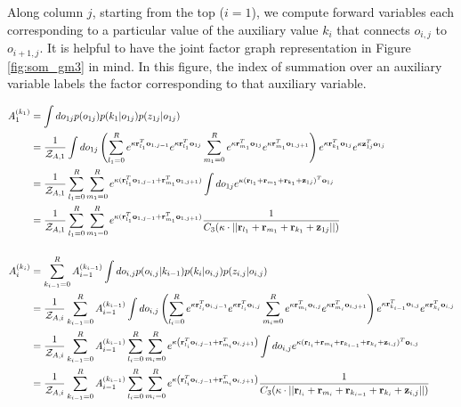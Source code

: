 \documentclass[11pt]{article}
\newcommand{\mc}{\mathcal}
\begin{document}
Along column $j$, starting from the top ($i=1$), we compute forward variables each corresponding to a particular value of the auxiliary value $k_i$ that connects $o_{i,j}$ to $o_{i+1,j}$. It is helpful to have the joint factor graph representation in Figure \ref{fig:som_gm3} in mind. In this figure, the index of summation over an auxiliary variable labels the factor corresponding to that auxiliary variable.

\begin{align}
A_1^{(k_1)} &= \int do_{1j} p(o_{1j}) p(k_1|o_{1j}) p(z_{1j}|o_{1j}) \notag \\
&= \frac{1}{\mc{Z}_{A,1}} \int do_{1j} \left( \sum_{l_1=0}^R e^{\kappa \mathbf{r}_{l_1}^T \mathbf{o}_{1,j-1}}e^{\kappa \mathbf{r}_{l_1}^T \mathbf{o}_{1j}} \sum_{m_1=0}^R e^{\kappa \mathbf{r}_{m_1}^T \mathbf{o}_{1j}} e^{\kappa \mathbf{r}_{m_1}^T \mathbf{o}_{1,j+1}} \right) e^{\kappa \mathbf{r}_{k_1}^T \mathbf{o}_{1j}} e^{\kappa \mathbf{z}_{1j}^T\mathbf{o}_{1j}} \notag \\
&= \frac{1}{\mc{Z}_{A,1}}  \sum_{l_1=0}^R \sum_{m_1=0}^R e^{\kappa (\mathbf{r}_{l_1}^T\mathbf{o}_{1,j-1}+\mathbf{r}_{m_1}^T\mathbf{o}_{1,j+1})} \int do_{1j} e^{\kappa(\mathbf{r}_{l_1}+\mathbf{r}_{m_1}+\mathbf{r}_{k_1}+\mathbf{z}_{1j})^T\mathbf{o}_{1j}} \notag \\
&= \frac{1}{\mc{Z}_{A,1}}  \sum_{l_1=0}^R \sum_{m_1=0}^R e^{\kappa (\mathbf{r}_{l_1}^T\mathbf{o}_{1,j-1}+\mathbf{r}_{m_1}^T\mathbf{o}_{1,j+1})} \frac{1}{C_3(\kappa\cdot ||\mathbf{r}_{l_1}+\mathbf{r}_{m_1}+\mathbf{r}_{k_1}+\mathbf{z}_{1j}||)} \\[5mm]
A_i^{(k_i)} &= \sum_{k_{i-1}=0}^R A_{i-1}^{(k_{i-1})} \int do_{i,j} p(o_{i,j}|k_{i-1})p(k_i|o_{i,j})p(z_{i,j}|o_{i,j}) \notag \\
&= \frac{1}{\mc{Z}_{A,i}}  \sum_{k_{i-1}=0}^R A_{i-1}^{(k_{i-1})} \int do_{i,j} \left( \sum_{l_i=0}^R e^{\kappa\mathbf{r}_{l_i}^T\mathbf{o}_{i,j-1}} e^{\kappa\mathbf{r}_{l_i}^T\mathbf{o}_{i,j}} \sum_{m_i=0}^R e^{\kappa\mathbf{r}_{m_i}^T\mathbf{o}_{i,j}} e^{\kappa\mathbf{r}_{m_i}^T\mathbf{o}_{i,j+1}}\right) e^{\kappa \mathbf{r}_{k_{i-1}}^T \mathbf{o}_{i,j}} e^{\kappa \mathbf{r}_{k_i}^T \mathbf{o}_{i,j}} \notag \\
&= \frac{1}{\mc{Z}_{A,i}}  \sum_{k_{i-1}=0}^R A_{i-1}^{(k_{i-1})} \sum_{l_i=0}^R \sum_{m_i=0}^R e^{\kappa\left(\mathbf{r}_{l_i}^T\mathbf{o}_{i,j-1}+\mathbf{r}_{m_i}^T\mathbf{o}_{i,j+1}\right)} \int do_{i,j} e^{\kappa(\mathbf{r}_{l_i}+\mathbf{r}_{m_i}+\mathbf{r}_{k_{i-1}}+\mathbf{r}_{k_i}+\mathbf{z}_{i,j})^T\mathbf{o}_{i,j}} \notag \\
&= \frac{1}{\mc{Z}_{A,i}}  \sum_{k_{i-1}=0}^R A_{i-1}^{(k_{i-1})} \sum_{l_i=0}^R \sum_{m_i=0}^R e^{\kappa\left(\mathbf{r}_{l_i}^T\mathbf{o}_{i,j-1}+\mathbf{r}_{m_i}^T\mathbf{o}_{i,j+1}\right)} \frac{1}{C_3(\kappa\cdot ||\mathbf{r}_{l_i}+\mathbf{r}_{m_i}+\mathbf{r}_{k_{i-1}}+\mathbf{r}_{k_i}+\mathbf{z}_{i,j}||)}
\end{align}
\end{document}
